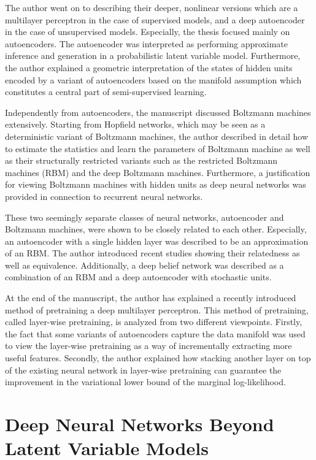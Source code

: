 \documentclass{now}
\begin{document}
The author went on to describing their deeper, nonlinear versions which are a
multilayer perceptron in the case of supervised models, and a deep autoencoder
in the case of unsupervised models. Especially, the thesis focused mainly on
autoencoders. The autoencoder was interpreted as performing approximate
inference and generation in a probabilistic latent variable model.  Furthermore,
the author explained a geometric interpretation of the states of hidden units
encoded by a variant of autoencoders based on the manifold assumption which
constitutes a central part of semi-supervised learning.

Independently from autoencoders, the manuscript discussed Boltzmann machines
extensively. Starting from Hopfield networks, which may be seen as a
deterministic variant of Boltzmann machines, the author described in detail how
to estimate the statistics and learn the parameters of Boltzmann machine as well
as their structurally restricted variants such as the restricted Boltzmann
machines (RBM) and the deep Boltzmann machines. Furthermore, a justification for
viewing Boltzmann machines with hidden units as deep neural networks was
provided in connection to recurrent neural networks.

These two seemingly separate classes of neural networks, autoencoder and
Boltzmann machines, were shown to be closely related to each other. Especially,
an autoencoder with a single hidden layer was described to be an approximation
of an RBM. The author introduced recent studies showing their relatedness as
well as equivalence. Additionally, a deep belief network was described as a
combination of an RBM and a deep autoencoder with stochastic units.

At the end of the manuscript, the author has explained a recently introduced
method of pretraining a deep multilayer perceptron. This method of pretraining,
called layer-wise pretraining, is analyzed from two different viewpoints.
Firstly, the fact that some variants of autoencoders capture the data manifold
was used to view the layer-wise pretraining as a way of incrementally extracting
more useful features. Secondly, the author explained how stacking another layer
on top of the existing neural network in layer-wise pretraining can guarantee
the improvement in the variational lower bound of the marginal log-likelihood.


\section{Deep Neural Networks Beyond Latent Variable Models}
\end{document}
